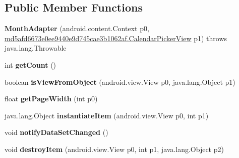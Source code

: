 \subsection*{Public Member Functions}
\begin{DoxyCompactItemize}
\item 
\hypertarget{classmd5afd6673e0ee9440e9d745cae3b1062af_1_1MonthAdapter_a31afb84212b569dfec470f8679155226}{}{\bfseries Month\+Adapter} (android.\+content.\+Context p0, \hyperlink{classmd5afd6673e0ee9440e9d745cae3b1062af_1_1CalendarPickerView}{md5afd6673e0ee9440e9d745cae3b1062af.\+Calendar\+Picker\+View} p1)  throws java.\+lang.\+Throwable 	\label{classmd5afd6673e0ee9440e9d745cae3b1062af_1_1MonthAdapter_a31afb84212b569dfec470f8679155226}

\item 
\hypertarget{classmd5afd6673e0ee9440e9d745cae3b1062af_1_1MonthAdapter_a7a9d08db94edd5b66c809b0f725b7dbe}{}int {\bfseries get\+Count} ()\label{classmd5afd6673e0ee9440e9d745cae3b1062af_1_1MonthAdapter_a7a9d08db94edd5b66c809b0f725b7dbe}

\item 
\hypertarget{classmd5afd6673e0ee9440e9d745cae3b1062af_1_1MonthAdapter_ad657437b329c38356e4b58731b7d4caf}{}boolean {\bfseries is\+View\+From\+Object} (android.\+view.\+View p0, java.\+lang.\+Object p1)\label{classmd5afd6673e0ee9440e9d745cae3b1062af_1_1MonthAdapter_ad657437b329c38356e4b58731b7d4caf}

\item 
\hypertarget{classmd5afd6673e0ee9440e9d745cae3b1062af_1_1MonthAdapter_aa8bdfaa2b28955a92c85049d8b1cd400}{}float {\bfseries get\+Page\+Width} (int p0)\label{classmd5afd6673e0ee9440e9d745cae3b1062af_1_1MonthAdapter_aa8bdfaa2b28955a92c85049d8b1cd400}

\item 
\hypertarget{classmd5afd6673e0ee9440e9d745cae3b1062af_1_1MonthAdapter_abb63612c50029b862473bf55e9c74d66}{}java.\+lang.\+Object {\bfseries instantiate\+Item} (android.\+view.\+View p0, int p1)\label{classmd5afd6673e0ee9440e9d745cae3b1062af_1_1MonthAdapter_abb63612c50029b862473bf55e9c74d66}

\item 
\hypertarget{classmd5afd6673e0ee9440e9d745cae3b1062af_1_1MonthAdapter_a8a433b53042f2f539e8e69ba9056e462}{}void {\bfseries notify\+Data\+Set\+Changed} ()\label{classmd5afd6673e0ee9440e9d745cae3b1062af_1_1MonthAdapter_a8a433b53042f2f539e8e69ba9056e462}

\item 
\hypertarget{classmd5afd6673e0ee9440e9d745cae3b1062af_1_1MonthAdapter_a0eb912feea1f7c9c2c3e0657034dadaa}{}void {\bfseries destroy\+Item} (android.\+view.\+View p0, int p1, java.\+lang.\+Object p2)\label{classmd5afd6673e0ee9440e9d745cae3b1062af_1_1MonthAdapter_a0eb912feea1f7c9c2c3e0657034dadaa}


\end{DoxyCompactItemize}
